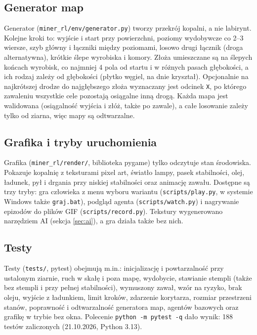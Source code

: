 \documentclass[11pt,a4paper]{article}
\begin{document}
\subsection{Generator map}
Generator (\texttt{miner\_rl/env/generator.py}) tworzy przekrój kopalni, a nie
labirynt. Kolejne kroki to: wyjście i start przy powierzchni, poziomy wydobywcze
co 2--3 wiersze, szyb główny i łączniki między poziomami, losowo drugi łącznik
(droga alternatywna), krótkie ślepe wyrobiska i komory. Złoża umieszczane są na
ślepych końcach wyrobisk, co najmniej 4 pola od startu i w różnych pasach
głębokości, a ich rodzaj zależy od głębokości (płytko węgiel, na dnie kryształ).
Opcjonalnie na najkrótszej drodze do najgłębszego złoża wyznaczany jest odcinek
\texttt{X}, po którego zawaleniu wszystkie cele pozostają osiągalne inną drogą.
Każda mapa jest walidowana (osiągalność wyjścia i złóż, także po zawale), a całe
losowanie zależy tylko od ziarna, więc mapy są odtwarzalne.

\subsection{Grafika i tryby uruchomienia}
Grafika (\texttt{miner\_rl/render/}, biblioteka pygame) tylko odczytuje stan
środowiska. Pokazuje kopalnię z teksturami pixel art, światło lampy, pasek
stabilności, olej, ładunek, pył i drgania przy niskiej stabilności oraz animację
zawału. Dostępne są trzy tryby: gra człowieka z menu wyboru wariantu
(\texttt{scripts/play.py}, w systemie Windows także \texttt{graj.bat}), podgląd
agenta (\texttt{scripts/watch.py}) i nagrywanie epizodów do plików GIF
(\texttt{scripts/record.py}). Tekstury wygenerowano narzędziem AI (sekcja
\ref{sec:ai}), a gra działa także bez nich.

\subsection{Testy}
Testy (\texttt{tests/}, pytest) obejmują m.in.: inicjalizację i powtarzalność
przy ustalonym ziarnie, ruch w skałę i poza mapę, wydobycie, stawianie stempli
(także bez stempli i przy pełnej stabilności), wymuszony zawał, wzór na ryzyko,
brak oleju, wyjście z ładunkiem, limit kroków, zdarzenie korytarza, rozmiar
przestrzeni stanów, poprawność i odtwarzalność generatora map, agentów bazowych
oraz grafikę w trybie bez okna. Polecenie \texttt{python -m pytest -q} dało
wynik: 188 testów zaliczonych (21.10.2026, Python 3.13).
\end{document}
